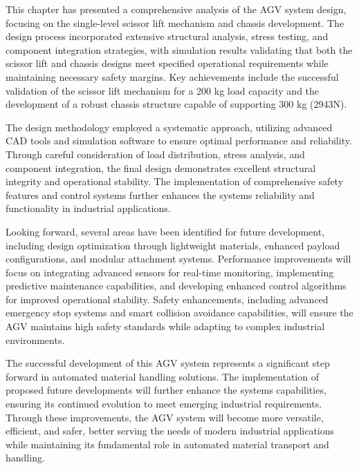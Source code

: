 \documentclass[../../main]{subfiles}
\begin{document}
This chapter has presented a comprehensive analysis of the AGV system
design, focusing on the single-level scissor lift mechanism and chassis
development. The design process incorporated extensive structural
analysis, stress testing, and component integration strategies, with
simulation results validating that both the scissor lift and chassis
designs meet specified operational requirements while maintaining
necessary safety margins. Key achievements include the successful
validation of the scissor lift mechanism for a 200 kg load capacity and
the development of a robust chassis structure capable of supporting 300
kg (2943N).

The design methodology employed a systematic approach, utilizing
advanced CAD tools and simulation software to ensure optimal performance
and reliability. Through careful consideration of load distribution,
stress analysis, and component integration, the final design
demonstrates excellent structural integrity and operational stability.
The implementation of comprehensive safety features and control systems
further enhances the system\textquotesingle s reliability and
functionality in industrial applications.

Looking forward, several areas have been identified for future
development, including design optimization through lightweight
materials, enhanced payload configurations, and modular attachment
systems. Performance improvements will focus on integrating advanced
sensors for real-time monitoring, implementing predictive maintenance
capabilities, and developing enhanced control algorithms for improved
operational stability. Safety enhancements, including advanced emergency
stop systems and smart collision avoidance capabilities, will ensure the
AGV maintains high safety standards while adapting to complex industrial
environments.

The successful development of this AGV system represents a significant
step forward in automated material handling solutions. The
implementation of proposed future developments will further enhance the
system\textquotesingle s capabilities, ensuring its continued evolution
to meet emerging industrial requirements. Through these improvements,
the AGV system will become more versatile, efficient, and safer, better
serving the needs of modern industrial applications while maintaining
its fundamental role in automated material transport and handling.
\end{document}
